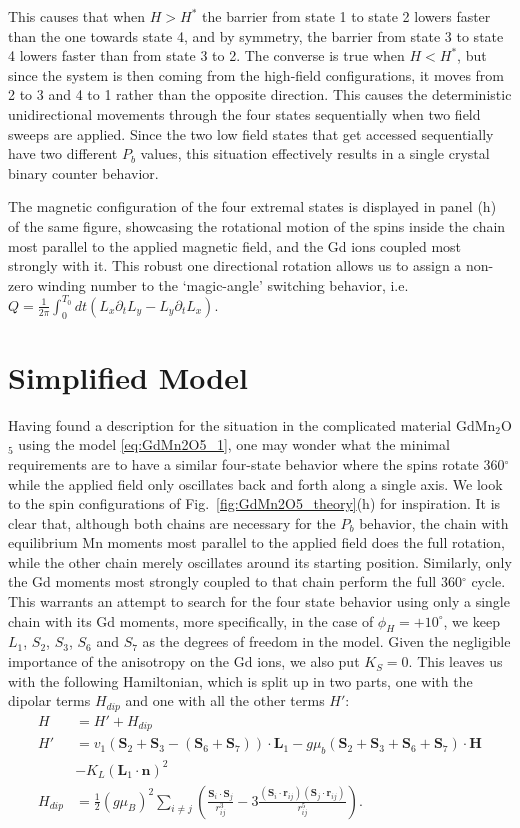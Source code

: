 This causes that when $H > H^*$ the barrier from state 1 to state 2 lowers faster than the one towards state 4, and by symmetry, the barrier from state 3 to state 4 lowers faster than from state 3 to 2.
The converse is true when $H < H^*$, but since the system is then coming from the high-field configurations, it moves from 2 to 3 and 4 to 1 rather than the opposite direction.
This causes the deterministic unidirectional movements through the four states sequentially when two field sweeps are applied.
Since the two low field states that get accessed sequentially have two different $P_b$ values, this situation effectively results in a single crystal binary counter behavior.  

The magnetic configuration of the four extremal states is displayed in panel (h) of the same figure, showcasing the rotational motion of the spins inside the chain most parallel to the applied magnetic field, and the Gd ions coupled most strongly with it.
This robust one directional rotation allows us to assign a non-zero winding number to the `magic-angle' switching behavior, i.e. $Q=\frac{1}{2\pi}\int_0^{T_0} dt (L_x\partial_t L_y - L_y \partial_t L_x)$. 

\section{Simplified Model}
Having found a description for the situation in the complicated material GdMn$_2$O$_5$ using the model \ref{eq:GdMn2O5_1}, one may wonder what the minimal requirements are to have a similar four-state behavior where the spins rotate 360$^\circ$ while the applied field only oscillates back and forth along a single axis.
We look to the spin configurations of Fig.~\ref{fig:GdMn2O5_theory}(h) for inspiration.
It is clear that, although both chains are necessary for the $P_b$ behavior, the chain with equilibrium Mn moments most parallel to the applied field does the full rotation, while the other chain merely oscillates around its starting position.
Similarly, only the Gd moments most strongly coupled to that chain perform the full 360$^\circ$ cycle.
This warrants an attempt to search for the four state behavior using only a single chain with its Gd moments, more specifically, in the case of $\phi_H = +10^\circ$, we keep $L_1$, $S_2$, $S_3$, $S_6$ and $S_7$ as the degrees of freedom in the model.
Given the negligible importance of the anisotropy on the Gd ions, we also put $K_S = 0$.
This leaves us with the following Hamiltonian, which is split up in two parts, one with the dipolar terms $H_{dip}$ and one with all the other terms $H'$:
\begin{align}
	H &= H' + H_{dip} \\
	H' &= v_1(\mathbf{S}_2 + \mathbf{S}_3 - (\mathbf{S}_6 + \mathbf{S}_7))\cdot\mathbf{L}_1 - g \mu_b (\mathbf{S}_2 + \mathbf{S}_3 + \mathbf{S}_6 + \mathbf{S}_7) \cdot \mathbf{H} \\
	&- K_L (\mathbf{L}_1 \cdot \mathbf{n})^2 \\
	H_{dip} &= \frac{1}{2}(g \mu_B)^2\sum_{i\neq j}\left(\frac{\mathbf{S}_i\cdot \mathbf{S}_j}{r_{ij}^3}-3\frac{(\mathbf{S}_i\cdot \mathbf{r}_{ij})(\mathbf{S}_j\cdot \mathbf{r}_{ij})}{r_{ij}^5}\right).
\end{align}


